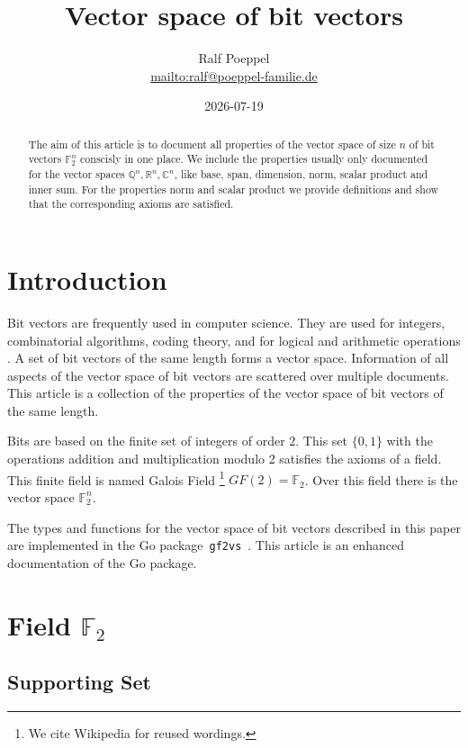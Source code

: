 \documentclass[a4paper]{article}
\title{Vector space of bit vectors}
\author{Ralf Poeppel \\ \url{mailto:ralf@poeppel-familie.de}}
\date{2026-07-19}
\newcommand{\BC}{\mathbb{C}}
\newcommand{\BF}{\mathbb{F}}
\newcommand{\BQ}{\mathbb{Q}}
\newcommand{\BR}{\mathbb{R}}
\newcommand{\0}{\mathbf{0}}
\newcommand{\1}{\mathbf{1}}
\begin{document}
\maketitle

\begin{abstract}
The aim of this article is to document all properties of the vector space of size $n$ of bit vectors $\BF_2^n$
conscisly in one place.
We include the properties usually only documented for the vector spaces $\BQ^n, \BR^n, \BC^n$, like base, span, dimension,
norm, scalar product and inner sum. For the properties norm and
scalar product we provide definitions and show that the corresponding axioms are satisfied.
\end{abstract}

\section{Introduction}

Bit vectors are frequently used in computer science. They are used for integers,
combinatorial algorithms, coding theory,
and for logical and arithmetic operations \cite{knuth:taocp_v4_f1, Hill2004}.
A set of bit vectors of the same length forms a vector space.
Information of all aspects of the vector space of bit vectors are scattered over multiple documents.
This article is a collection of the properties of the vector space of bit vectors of the same length.

Bits are based on the finite set of integers of order $2$. This set $\{0, 1\}$ with the operations addition and multiplication modulo 2 satisfies the axioms of a field. This finite field is named Galois Field \cite{Lidl2000, wikipedia_en_2026_GaloisField}\footnote{We cite Wikipedia for reused wordings.} $GF(2) = \BF_2$. Over this field there is the vector space $\BF_2^n$.

The types and functions for the vector space of bit vectors described in this paper are implemented in the
Go package~\texttt{gf2vs}~\cite{rp:gopkg:gf2vs}.
This article is an enhanced documentation of the Go package.

\section{\texorpdfstring{Field $\BF_2$}{Field F2}}

\subsection{Supporting Set}
\end{document}
